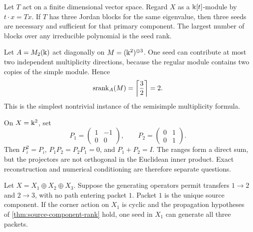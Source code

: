 \begin{microexample}[title={R1: one operator with several primary blocks}]
Let \(T\) act on a finite dimensional vector space.  Regard \(X\) as a \(\Bbbk[t]\)-module by \(t\cdot x=Tx\).  If \(T\) has three Jordan blocks for the same eigenvalue, then three seeds are necessary and sufficient for that primary component.  The largest number of blocks over any irreducible polynomial is the seed rank.
\end{microexample}

\begin{microexample}[title={R2: a matrix algebra with multiplicity}]
Let \(A=M_2(\Bbbk)\) act diagonally on \(M=(\Bbbk^2)^{\oplus3}\).  One seed can contribute at most two independent multiplicity directions, because the regular module contains two copies of the simple module.  Hence
\[
\operatorname{srank}_A(M)=\left\lceil\frac{3}{2}\right\rceil=2.
\]
This is the simplest nontrivial instance of the semisimple multiplicity formula.
\end{microexample}

\begin{microexample}[title={R3: an exact but oblique packet split}]
On \(X=\Bbbk^2\), set
\[
P_1=\begin{pmatrix}1&-1\\0&0\end{pmatrix},
\qquad
P_2=\begin{pmatrix}0&1\\0&1\end{pmatrix}.
\]
Then \(P_i^2=P_i\), \(P_1P_2=P_2P_1=0\), and \(P_1+P_2=I\).  The ranges form a direct sum, but the projectors are not orthogonal in the Euclidean inner product.  Exact reconstruction and numerical conditioning are therefore separate questions.
\end{microexample}

\begin{microexample}[title={R4: a directed packet system}]
Let \(X=X_1\oplus X_2\oplus X_3\).  Suppose the generating operators permit transfers \(1\to2\) and \(2\to3\), with no path entering packet \(1\).  Packet \(1\) is the unique source component.  If the corner action on \(X_1\) is cyclic and the propagation hypotheses of \cref{thm:source-component-rank} hold, one seed in \(X_1\) can generate all three packets.
\end{microexample}

